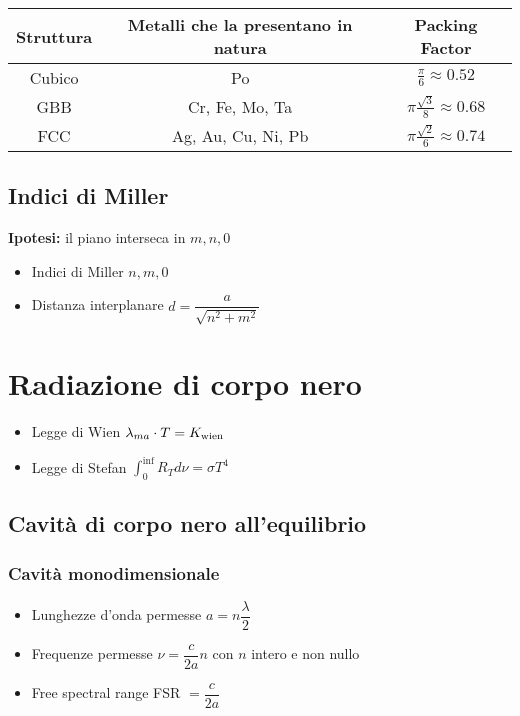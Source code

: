 \documentclass{article}
\begin{document}
\vspace{1cm}
\renewcommand{\arraystretch}{2}
\begin{tabular}{|c|c|c|}
  \hline
  \textbf{Struttura} & \textbf{Metalli che la presentano in natura} & \textbf{Packing Factor}                  \\
  \hline
  Cubico             & Po                                           & \(\frac{\pi}{6} \approx 0.52 \)          \\
  \hline
  GBB                & Cr, Fe, Mo, Ta                               & \(\pi \frac{\sqrt{3}}{8} \approx 0.68 \) \\
  \hline
  FCC                & Ag, Au, Cu, Ni, Pb                           & \(\pi \frac{\sqrt{2}}{6} \approx 0.74 \) \\
  \hline
\end{tabular}
\renewcommand{\arraystretch}{1}
\vspace{1cm}

\subsection{Indici di Miller}
\textbf{Ipotesi:} il piano interseca in \( {m, n, 0} \)
\begin{itemize}
  \item Indici di Miller \( {n, m, 0} \)
  \item Distanza interplanare \( d = \dfrac{a}{\sqrt{n^2+m^2}} \)
\end{itemize}

\section{Radiazione di corpo nero}
\begin{itemize}
  \item Legge di Wien \( \lambda_{ma} \cdot T = K_{\textnormal{wien}} \)
  \item Legge di Stefan \( \displaystyle \int_{0}^{\inf} R_T d \nu = \sigma T ^ 4 \)
\end{itemize}
\subsection{Cavità di corpo nero all'equilibrio}
\subsubsection{Cavità monodimensionale}
\begin{itemize}
  \item Lunghezze d'onda permesse \( a = n \dfrac{\lambda}{2} \)
  \item Frequenze permesse \( \nu = \dfrac{c}{2a} n \) con \( n \) intero e non nullo
  \item Free spectral range FSR \( = \dfrac{c}{2a} \)
\end{itemize}
\end{document}
